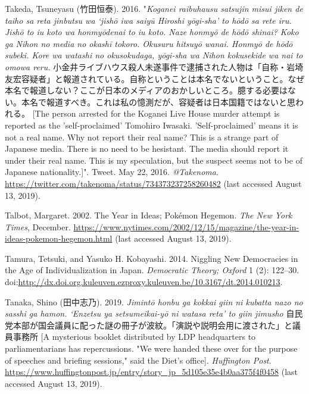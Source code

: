 \documentclass[10pt,british,A4paper,oneside]{memoir}
\begin{document}
\hypertarget{ref-takeda_eng._2016}{}
Takeda, Tsuneyasu (竹田恒泰). 2016. "\emph{Koganei raibuhausu satsujin misui jiken de taiho sa reta jinbutsu wa `jishō iwa saiyū Hiroshi yōgi-sha' to hōdō sa rete iru. Jishō to iu koto wa honmyōdenai to iu koto. Naze honmyō de hōdō shinai? Koko ga Nihon no media no okashī tokoro. Okusuru hitsuyō wanai. Honmyō de hōdō subeki. Kore wa watashi no okusokudaga, yōgi-sha wa Nihon kokusekide wa nai to omowa reru.} 小金井ライブハウス殺人未遂事件で逮捕された人物は「自称・岩埼友宏容疑者」と報道されている。自称ということは本名でないということ。なぜ本名で報道しない？ここが日本のメディアのおかしいところ。臆する必要はない。本名で報道すべき。これは私の憶測だが、容疑者は日本国籍ではないと思われる。 [The person arrested for the Koganei Live House murder attempt is reported as the 'self-proclaimed' Tomohiro Iwasaki. 'Self-proclaimed' means it is not a real name. Why not report their real name? This is a strange part of Japanese media. There is no need to be hesistant. The media should report it under their real name. This is my speculation, but the suspect seems not to be of Japanese nationality.]". Tweet. May 22, 2016. \emph{@Takenoma}.
\url{https://twitter.com/takenoma/status/734373237258260482} (last accessed August 13, 2019).

\hypertarget{ref-talbot_year_2002}{}
Talbot, Margaret. 2002. The Year in Ideas; Pokémon Hegemon. \emph{The
New York Times}, December.
\url{https://www.nytimes.com/2002/12/15/magazine/the-year-in-ideas-pokemon-hegemon.html} (last accessed August 13, 2019).

\hypertarget{ref-tamura_niggling_2014}{}
Tamura, Tetsuki, and Yasuko H. Kobayashi. 2014. Niggling New Democracies
in the Age of Individualization in Japan. \emph{Democratic Theory;
Oxford} 1 (2): 122--30.
doi:\href{https://doi.org/http://dx.doi.org.kuleuven.ezproxy.kuleuven.be/10.3167/dt.2014.010213}{http://dx.doi.org.kuleuven.ezproxy.kuleuven.be/10.3167/dt.2014.010213}.

\hypertarget{ref-tanaka_eng._2019}{}
Tanaka, Shino (田中志乃). 2019. \emph{Jimintō honbu ga kokkai giin ni kubatta nazo no sasshi ga hamon. `Enzetsu ya setsumeikai-yō ni watasa reta' to giin jimusho} 自民党本部が国会議員に配った謎の冊子が波紋。「演説や説明会用に渡された」と議員事務所 [A mysterious booklet distributed by LDP headquarters to parliamentarians has repercussions. "We were handed these over for the purpose of speeches and briefing sessions," said the Diet's office]. \emph{Huffington Post}.
\url{https://www.huffingtonpost.jp/entry/story_jp_5d105e35e4b0aa375f4f0458} (last accessed August 13, 2019).
\end{document}
